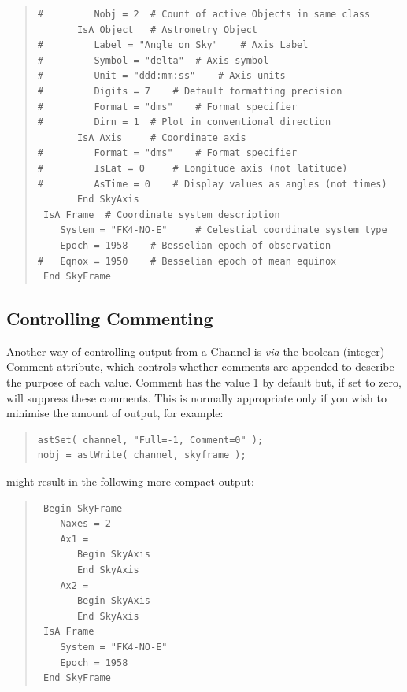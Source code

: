 \documentclass[twoside,11pt]{article}
\newcommand{\htmlref}[2]{#1}
\begin{document}
\begin{quote}
\begin{verbatim}
#         Nobj = 2 	# Count of active Objects in same class
       IsA Object 	# Astrometry Object
#         Label = "Angle on Sky" 	# Axis Label
#         Symbol = "delta" 	# Axis symbol
#         Unit = "ddd:mm:ss" 	# Axis units
#         Digits = 7 	# Default formatting precision
#         Format = "dms" 	# Format specifier
#         Dirn = 1 	# Plot in conventional direction
       IsA Axis 	# Coordinate axis
#         Format = "dms" 	# Format specifier
#         IsLat = 0 	# Longitude axis (not latitude)
#         AsTime = 0 	# Display values as angles (not times)
       End SkyAxis
 IsA Frame 	# Coordinate system description
    System = "FK4-NO-E" 	# Celestial coordinate system type
    Epoch = 1958 	# Besselian epoch of observation
#   Eqnox = 1950 	# Besselian epoch of mean equinox
 End SkyFrame
\end{verbatim}
\normalsize
\end{quote}

\subsection{\label{ss:channelcommenting}Controlling Commenting}

Another way of controlling output from a \htmlref{Channel}{Channel} is {\em{via}} the
boolean (integer) \htmlref{Comment}{Comment} attribute, which controls whether comments
are appended to describe the purpose of each value. Comment has the
value 1 by default but, if set to zero, will suppress these
comments. This is normally appropriate only if you wish to minimise
the amount of output, for example:

\begin{quote}
\small
\begin{verbatim}
astSet( channel, "Full=-1, Comment=0" );
nobj = astWrite( channel, skyframe );
\end{verbatim}
\normalsize
\end{quote}

might result in the following more compact output:

\begin{quote}
\small
\begin{verbatim}
 Begin SkyFrame
    Naxes = 2
    Ax1 =
       Begin SkyAxis
       End SkyAxis
    Ax2 =
       Begin SkyAxis
       End SkyAxis
 IsA Frame
    System = "FK4-NO-E"
    Epoch = 1958
 End SkyFrame
\end{verbatim}
\normalsize
\end{quote}
\end{document}
